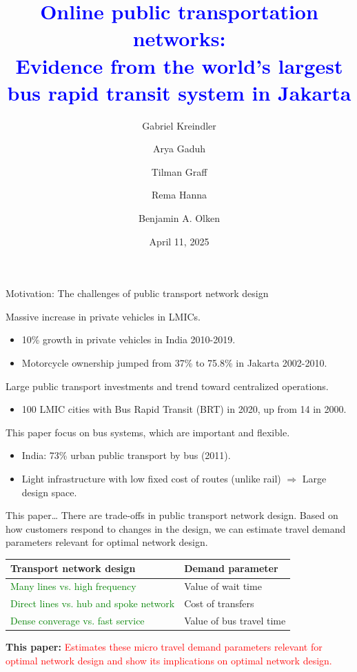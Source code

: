 \documentclass[notes,11pt, aspectratio=169]{beamer}
\title{\textcolor{blue}{Online public transportation networks:\\ \normalsize Evidence from the world's largest bus rapid transit system in Jakarta}}
\author{Gabriel Kreindler \and Arya Gaduh \and Tilman Graff \and Rema Hanna \and Benjamin A. Olken}
\institute{\textit{Conditionally accepted, AER}\\\vspace{1em} \large Presenter: Hyoungchul Kim}
\date{April 11, 2025}
\newenvironment{wideitemize}{\itemize\addtolength{\itemsep}{0.4em}}{\enditemize}
\begin{document}
\begin{frame}[plain]
	\titlepage
\end{frame}

\setcounter{framenumber}{0}

\begin{frame}{Motivation: The challenges of public transport network design}
	\begin{wideitemize}
		\item Massive increase in private vehicles in LMICs.
			\begin{itemize}
				\item 10\% growth in private vehicles in India 2010-2019.
				\item Motorcycle ownership jumped from 37\% to 75.8\% in Jakarta 2002-2010. 
			\end{itemize}
		\item Large public transport investments and trend toward centralized operations.
			\begin{itemize}
				\item 100 LMIC cities with Bus Rapid Transit (BRT) in 2020, up from 14 in 2000.
			\end{itemize}
		\item This paper focus on bus systems, which are important and flexible.
			\begin{itemize}
				\item India: 73\% urban public transport by bus (2011).
				\item Light infrastructure with low fixed cost of routes (unlike rail) $\Rightarrow$ Large design space.
			\end{itemize}
	\end{wideitemize}	
\end{frame}

\begin{frame}{This paper\ldots}
	There are trade-offs in public transport network design. Based on how customers respond to changes in the design, we can estimate travel demand parameters relevant for optimal network design.

	\begin{table}
		\begin{center}
			\begin{tabular}{l|l}
			\toprule
			\textbf{Transport network design} & \textbf{Demand parameter}\\	
			\hline
			\textcolor{green}{Many lines vs. high frequency} & Value of wait time\\
			\hline
			\textcolor{green}{Direct lines vs. hub and spoke network} & Cost of transfers\\
			\hline
			\textcolor{green}{Dense converage vs. fast service} & Value of bus travel time\\
			\bottomrule
		\end{tabular}
	\end{center}
\end{table}\vspace{2em}

\textbf{This paper:} \textcolor{red}{Estimates these micro travel demand parameters relevant for optimal network design and show its implications on optimal network design.}
\end{frame}
\end{document}
